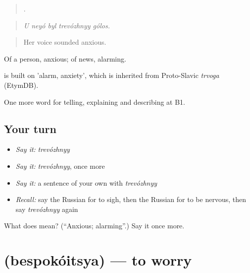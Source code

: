 \begin{quote}
    .
\end{quote}

\begin{quote}
\emph{U neyó byl trevózhnyy gólos.}
\end{quote}

\begin{quote}
Her voice sounded anxious.
\end{quote}

Of a person, anxious; of news, alarming.

\begin{cousinweb}
\emph{} is built on \emph{} 'alarm, anxiety', which is inherited from Proto-Slavic \emph{trvoga} (EtymDB).
\end{cousinweb}

\begin{grammarlens}[title={What you've built}]
One more word for telling, explaining and describing at B1.
\end{grammarlens}

\subsection*{Your turn}
\begin{itemize}
\raggedright
  \item \emph{Say it:} \emph{trevózhnyy}
  \item \emph{Say it:} \emph{trevózhnyy}, once more
  \item \emph{Say it:} a sentence of your own with \emph{trevózhnyy}
  \item \emph{Recall:} say the Russian for to sigh, then the Russian for to be nervous, then say \emph{trevózhnyy} again
\end{itemize}

\begin{tcolorbox}[breakable,colback=teal!4,colframe=teal!35!black,title={Before you move on}]
What does  mean? (\textquotedblleft{}Anxious; alarming\textquotedblright{}.) Say it once more.
\end{tcolorbox}
\section[\texorpdfstring{\ru{беспокоиться} (bespokóitsya)}{беспокоиться (bespokóitsya)}]{ (bespokóitsya) — to worry}

